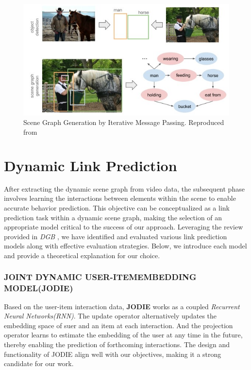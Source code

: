 \begin{figure}
    \centering
    \includegraphics[width=\linewidth]{figures/03_SGG.jpg}
    \caption{Scene Graph Generation by Iterative Message Passing. Reproduced from\cite{tang2020unbiased}}
    \label{fig:SGG}
\end{figure}

\section{Dynamic Link Prediction}


After extracting the dynamic scene graph from video data, the subsequent phase involves learning the interactions between elements within the scene to enable accurate behavior prediction. This objective can be conceptualized as a link prediction task within a dynamic scene graph, making the selection of an appropriate model critical to the success of our approach. Leveraging the review provided in \textit{DGB} \cite{poursafaei2022towards}, we have identified and evaluated various link prediction models along with effective evaluation strategies. Below, we introduce each model and provide a theoretical explanation for our choice.

\subsubsection{ JOINT DYNAMIC USER-ITEMEMBEDDING MODEL(JODIE)}
Based on the user-item interaction data, \textbf{JODIE}\cite{kumar2019predicting} works as a coupled \textit{Recurrent Neural Networks(RNN)}. The update operator alternatively updates the embedding space of suer and an item at each interaction. And the projection operator learns to estimate the embedding of the user at any time in the future, thereby enabling the prediction of forthcoming interactions. The design and functionality of JODIE align well with our objectives, making it a strong candidate for our work.

